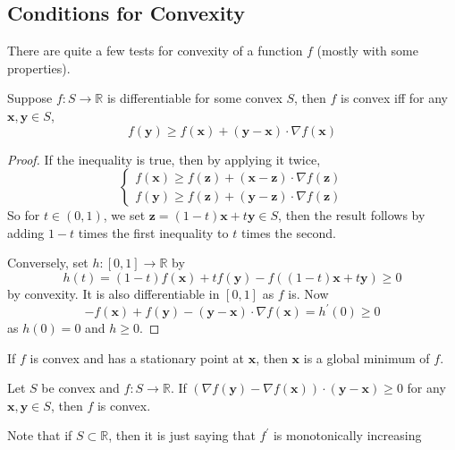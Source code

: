 \documentclass[a4paper]{article}
\begin{document}
\subsection{Conditions for Convexity}
There are quite a few tests for convexity of a function $f$ (mostly with some properties).
\begin{proposition}
    Suppose $f:S\to\mathbb R$ is differentiable for some convex $S$, then $f$ is convex iff for any $\mathbf{x},\mathbf{y}\in S$,
    $$f(\mathbf{y})\ge f(\mathbf{x})+(\mathbf{y}-\mathbf{x})\cdot\nabla f(\mathbf{x})$$
\end{proposition}
\begin{proof}
    If the inequality is true, then by applying it twice,
    $$\begin{cases}
        f(\mathbf{x})\ge f(\mathbf{z})+(\mathbf{x}-\mathbf{z})\cdot\nabla f(\mathbf{z})\\
        f(\mathbf{y})\ge f(\mathbf{z})+(\mathbf{y}-\mathbf{z})\cdot\nabla f(\mathbf{z})
    \end{cases}$$
    So for $t\in (0,1)$, we set $\mathbf{z}=(1-t)\mathbf{x}+t\mathbf{y}\in S$, then the result follows by adding $1-t$ times the first inequality to $t$ times the second.

    Conversely, set $h:[0,1]\to\mathbb R$ by
    $$h(t)=(1-t)f(\mathbf{x})+tf(\mathbf{y})-f((1-t)\mathbf{x}+t\mathbf{y})\ge 0$$
    by convexity.
    It is also differentiable in $[0,1]$ as $f$ is.
    Now
    $$-f(\mathbf{x})+f(\mathbf{y})-(\mathbf{y}-\mathbf{x})\cdot\nabla f(\mathbf{x})=h^\prime(0)\ge 0$$
    as $h(0)=0$ and $h\ge 0$.
\end{proof}
\begin{corollary}
    If $f$ is convex and has a stationary point at $\mathbf{x}$, then $\mathbf{x}$ is a global minimum of $f$.
\end{corollary}

\begin{proposition}
    Let $S$ be convex and $f:S\to\mathbb R$.
    If $(\nabla f(\mathbf{y})-\nabla f(\mathbf{x}))\cdot (\mathbf{y}-\mathbf{x})\ge 0$ for any $\mathbf{x},\mathbf{y}\in S$, then $f$ is convex.
\end{proposition}
Note that if $S\subset\mathbb R$, then it is just saying that $f^\prime$ is monotonically increasing
\end{document}
